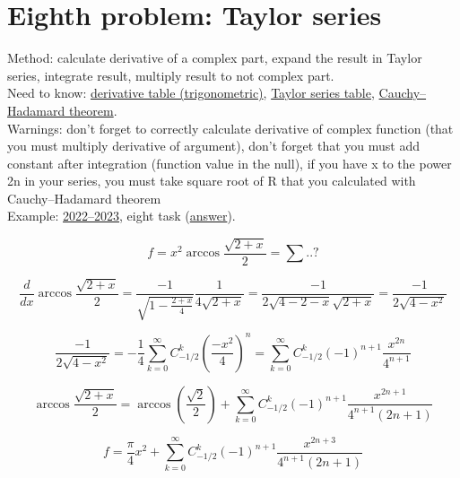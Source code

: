 \documentclass{article}
\begin{document}
\section{Eighth problem: Taylor series}
Method: calculate derivative of a complex part, expand the result in Taylor series, integrate result, multiply result to not complex part. \\
Need to know: \hyperlink{8.1}{derivative table (trigonometric)}, \hyperlink{8.2}{Taylor series table}, \hyperlink{8.3}{Cauchy–Hadamard theorem}. \\
Warnings: don't forget to correctly calculate derivative of complex function (that you must multiply derivative of argument), don't forget that you must add constant after integration (function value in the null), if you have x to the power 2n in your series, you must take square root of R that you calculated with Cauchy–Hadamard theorem \\
Example: \href{https://old.mipt.ru/education/chair/mathematics/exams/exams/2022-23/%D0%9C%D0%90%D0%98%D0%B8%D0%A0_%D0%92_23.pdf}{2022–2023}, eight task (\href{https://old.mipt.ru/education/chair/mathematics/exams/exams/2022-23/%D0%9C%D0%90%D0%98%D0%B8%D0%A0_%D0%92_23%D0%BE%D1%82%D0%B2%D0%B5%D1%82%D1%8B.pdf}{answer}).

\begin{equation}
    f = x^2 \arccos \frac{\sqrt{2+x}}{2} = \sum ..?
\end{equation}

\begin{equation*}
    \frac{d}{dx} \arccos \frac{\sqrt{2+x}}{2} = \frac{-1}{\sqrt{1-\frac{2+x}{4}}} \frac{1}{4\sqrt{2+x}} = \frac{-1}{2\sqrt{4-2-x}\sqrt{2+x}} = \frac{-1}{2\sqrt{4-x^2}}
\end{equation*}

\begin{equation*}
    \frac{-1}{2\sqrt{4-x^2}} = -\frac{1}{4}\sum_{k=0}^{\infty} C_{-1/2}^{k} (\frac{-x^2}{4})^{n} = \sum_{k=0}^{\infty} C_{-1/2}^{k} (-1)^{n+1} \frac{x^{2n}}{4^{n+1}}
\end{equation*}

\begin{equation*}
    \arccos \frac{\sqrt{2+x}}{2} = \arccos (\frac{\sqrt{2}}{2}) + \sum_{k=0}^{\infty} C_{-1/2}^{k} (-1)^{n+1} \frac{x^{2n+1}}{4^{n+1} (2n+1)}
\end{equation*}

\begin{equation}
    f = \frac{\pi}{4} x^2 + \sum_{k=0}^{\infty} C_{-1/2}^{k} (-1)^{n+1} \frac{x^{2n+3}}{4^{n+1} (2n+1)}
\end{equation}
\end{document}

